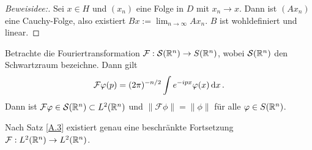 \documentclass{mycourse}
\begin{document}
\begin{proof}[Beweisidee:]
Sei $x\in H$ und $(x_n)$ eine Folge in $D$ mit $x_n \to x$. Dann ist $(Ax_n)$ eine Cauchy-Folge, also existiert $Bx:= \lim_{n\to \infty} Ax_n$. $B$ ist wohldefiniert und linear.
\end{proof}
\begin{ex*}
Betrachte die Fouriertransformation $\mathcal F: \mathcal S(\mathbb{R}^n)\to S(\mathbb{R}^n)$, wobei $\mathcal S(\mathbb{R}^n)$ den Schwartzraum bezeichne. Dann gilt
\[
\mathcal F\varphi(p)=(2\pi)^{-n/2} \int e^{-ipx} \varphi(x) \,\mathrm{d}x\,.
\]
Dann ist $\mathcal F \varphi\in \mathcal S(\mathbb{R}^n)\subset L^2(\mathbb{R}^n)$ und $\|\mathcal F \phi\|=\|\phi\|$ für alle $\varphi \in S(\mathbb{R}^n)$. 

Nach Satz \ref{A.3} existiert genau eine beschränkte Fortsetzung $\mathcal F: L^2(\mathbb{R}^n) \to L^2(\mathbb{R}^n)$.
\end{ex*}
\end{document}
